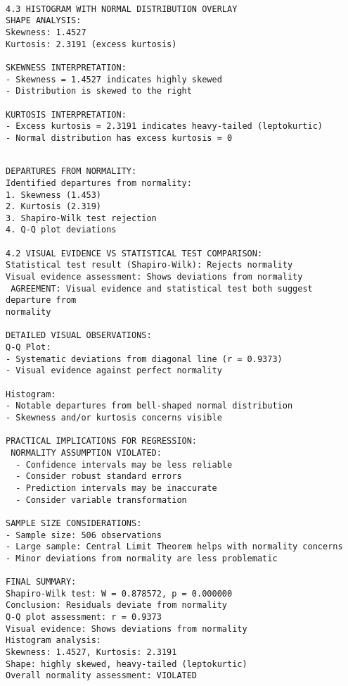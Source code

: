 \documentclass[8pt, twocolumn]{extarticle}
\begin{document}
    \centering
    \begin{Verbatim}[commandchars=\\\{\}]

4.3 HISTOGRAM WITH NORMAL DISTRIBUTION OVERLAY
SHAPE ANALYSIS:
Skewness: 1.4527
Kurtosis: 2.3191 (excess kurtosis)

SKEWNESS INTERPRETATION:
- Skewness = 1.4527 indicates highly skewed
- Distribution is skewed to the right

KURTOSIS INTERPRETATION:
- Excess kurtosis = 2.3191 indicates heavy-tailed (leptokurtic)
- Normal distribution has excess kurtosis = 0
    \end{Verbatim}

    \centering
    \begin{Verbatim}[commandchars=\\\{\}]

DEPARTURES FROM NORMALITY:
Identified departures from normality:
1. Skewness (1.453)
2. Kurtosis (2.319)
3. Shapiro-Wilk test rejection
4. Q-Q plot deviations

4.2 VISUAL EVIDENCE VS STATISTICAL TEST COMPARISON:
Statistical test result (Shapiro-Wilk): Rejects normality
Visual evidence assessment: Shows deviations from normality
 AGREEMENT: Visual evidence and statistical test both suggest departure from
normality

DETAILED VISUAL OBSERVATIONS:
Q-Q Plot:
- Systematic deviations from diagonal line (r = 0.9373)
- Visual evidence against perfect normality

Histogram:
- Notable departures from bell-shaped normal distribution
- Skewness and/or kurtosis concerns visible

PRACTICAL IMPLICATIONS FOR REGRESSION:
 NORMALITY ASSUMPTION VIOLATED:
  - Confidence intervals may be less reliable
  - Consider robust standard errors
  - Prediction intervals may be inaccurate
  - Consider variable transformation

SAMPLE SIZE CONSIDERATIONS:
- Sample size: 506 observations
- Large sample: Central Limit Theorem helps with normality concerns
- Minor deviations from normality are less problematic

FINAL SUMMARY:
Shapiro-Wilk test: W = 0.878572, p = 0.000000
Conclusion: Residuals deviate from normality
Q-Q plot assessment: r = 0.9373
Visual evidence: Shows deviations from normality
Histogram analysis:
Skewness: 1.4527, Kurtosis: 2.3191
Shape: highly skewed, heavy-tailed (leptokurtic)
Overall normality assessment: VIOLATED
    \end{Verbatim}
\end{document}
